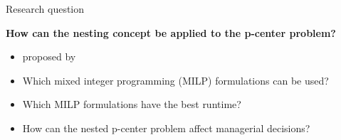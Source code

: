 \documentclass[utf8,aspectratio=169,ngerman,english]{beamer}
\begin{document}
\begin{frame}{Research question}
    \begin{exampleblock}{\vspace{-2em}}
        \textbf{How can the nesting concept be applied to the p-center problem?}
        \begin{itemize}
            \item proposed by \textcite{McGarvey2022} \pause
            \item Which mixed integer programming (MILP) formulations can be used?
            \item Which MILP formulations have the best runtime? 
            \item How can the nested p-center problem affect managerial decisions?
        \end{itemize} 
    \end{exampleblock} 
\end{frame}
\end{document}
